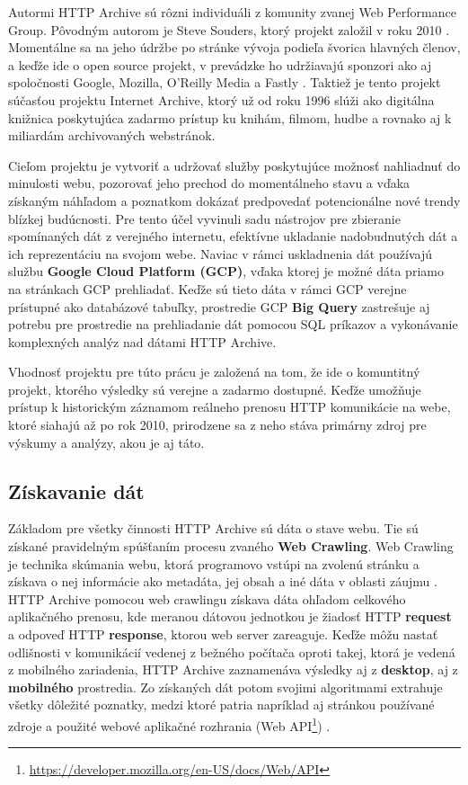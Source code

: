 Autormi HTTP Archive sú rôzni individuáli z komunity zvanej Web Performance Group. Pôvodným autorom je Steve Souders, ktorý projekt založil v roku 2010 \cite{httparchive-faq}.
Momentálne sa na jeho údržbe po stránke vývoja podieľa švorica hlavných členov, a keďže ide o open source projekt, v prevádzke ho udržiavajú sponzori ako aj spoločnosti Google, Mozilla, O'Reilly Media a Fastly \cite{httparchive-about}.
Taktiež je tento projekt súčasťou projektu Internet Archive, ktorý už od roku 1996 slúži ako digitálna knižnica poskytujúca zadarmo prístup ku knihám, filmom, hudbe a rovnako aj k miliardám archivovaných webstránok.

Cieľom projektu je vytvoriť a udržovať služby poskytujúce možnosť nahliadnuť do minulosti webu, pozorovať jeho prechod do momentálneho stavu a vďaka získaným náhľadom a poznatkom dokázať
predpovedať potencionálne nové trendy blízkej budúcnosti. 
Pre tento účel vyvinuli sadu nástrojov pre zbieranie spomínaných dát z verejného internetu, efektívne ukladanie nadobudnutých dát a ich reprezentáciu na svojom webe.
Naviac v rámci uskladnenia dát používajú službu \textbf{Google Cloud Platform (GCP)}, vďaka ktorej je možné dáta priamo na stránkach GCP prehliadať.
Keďže sú tieto dáta v rámci GCP verejne prístupné ako databázové tabuľky, prostredie GCP \textbf{Big Query} zastrešuje aj potrebu pre prostredie na prehliadanie dát pomocou SQL príkazov 
a vykonávanie komplexných analýz nad dátami HTTP Archive.

Vhodnosť projektu pre túto prácu je založená na tom, že ide o komuntitný projekt, ktorého výsledky sú verejne a zadarmo dostupné. Keďže umožňuje prístup k historickým záznamom reálneho prenosu HTTP komunikácie na webe, ktoré siahajú až po rok 2010, prirodzene sa z neho stáva primárny zdroj pre výskumy a analýzy, akou je aj táto.

\subsection{Získavanie dát}
\label{fetching-data}

Základom pre všetky činnosti HTTP Archive sú dáta o stave webu. Tie sú získané pravidelným spúšťaním procesu zvaného \textbf{Web Crawling}.
Web Crawling je technika skúmania webu, ktorá programovo vstúpi na zvolenú stránku a získava o nej informácie ako metadáta, jej obsah a iné dáta v oblasti záujmu \cite{httparchive-webcrawling}.
HTTP Archive pomocou web crawlingu získava dáta ohľadom celkového aplikačného prenosu, kde meranou dátovou jednotkou je žiadosť HTTP \textbf{request} a odpoveď HTTP \textbf{response}, ktorou web server zareaguje. 
Keďže môžu nastať odlišnosti v komunikácií vedenej z bežného počítača oproti takej, ktorá je vedená z mobilného zariadenia, HTTP Archive zaznamenáva výsledky aj z \textbf{desktop}, aj z \textbf{mobilného} prostredia.
Zo získaných dát potom svojimi algoritmami extrahuje všetky dôležité poznatky, medzi ktoré patria napríklad aj stránkou používané zdroje a použité webové aplikačné rozhrania (Web API\footnote{\href{https://developer.mozilla.org/en-US/docs/Web/API}{https://developer.mozilla.org/en-US/docs/Web/API}}) \cite{httparchive-homepage}.

